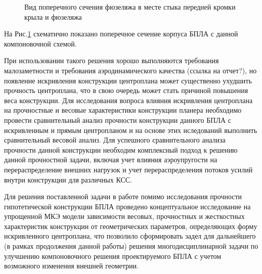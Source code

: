 \begin{figure}[ht]
\captionsetup{justification=centering}
\centering

\caption{Вид поперечного сечения фюзеляжа в месте стыка передней кромки крыла и фюзеляжа}
\label{fig:OriginalSectionWithEngine}
\end{figure}



На Рис.\ref{fig:OriginalSectionWithEngine} схематично показано поперечное сечение корпуса БПЛА с данной компоновочной схемой.

При использовании такого решения хорошо выполняются требования малозаметности и требования аэродинамического качества (ссылка на отчет?), но появление искривления конструкции центроплана может существенно ухудшить прочность центроплана, что в свою очередь может стать причиной повышения веса конструкции. Для исследования вопроса влияния искривления центроплана на прочностные и весовые характеристики конструкции планера необходимо провести сравнительный анализ прочности конструкции данного БПЛА с искривленным и прямым центропланом и на основе этих иследований выполнить сравнительный весовой анализ. Для успешного сравнительного анализа прочности данной конструкции необходим комплексный подход к решению данной прочностной задачи, включая учет влияния аэроупругости на перераспределение внешних нагрузок и учет перераспределения потоков усилий внутри конструкции для различных КСС.










Для решения поставленной задачи в работе помимо исследования прочности гипотетической конструкции БПЛА проведено концептуальное исследование на упрощенной МКЭ модели зависимости весовых, прочностных и жесткостных характеристик конструкции от геометрических параметров, определяющих форму искривленного центроплана, что позволило сформировать задел для дальнейшего (в рамках продолжения данной работы) решения многодисциплинарной задачи по улучшению компоновочного решения проектируемого БПЛА с учетом возможного изменения внешней геометрии. 


